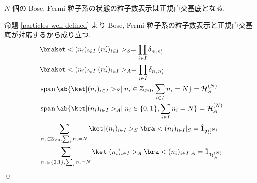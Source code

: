 \documentclass[uplatex,dvipdfmx,a4paper,11pt]{jlreq}
\makeatletter
\DeclareMathOperator{\Span}{span}
\newcommand{\ZZ}{\mathbb{Z}}
\newcommand{\HH}{\mathcal{H}}
\numberwithin{equation}{section}
\theoremstyle{definition}
\renewenvironment{proof}[1][\proofname]{\par
  \normalfont
  \topsep6\p@\@plus6\p@ \trivlist
  \item[\hskip\labelsep{\bfseries #1}\@addpunct{\bfseries}]\ignorespaces\quad\par
}{%
  \qed\endtrivlist\@endpefalse
}
\renewcommand\proofname{証明}
\makeatother
\begin{document}
\begin{theorem}
  $N$ 個の Bose, Fermi 粒子系の状態の粒子数表示は正規直交基底となる.
  \label{Fermi N character}
\end{theorem}
\begin{proof}
  命題 \ref{particles well defined} より Bose, Fermi 粒子系の粒子数表示と正規直交基底が対応するから成り立つ.
  \begin{align}
     & \braket<(n_i)_{i\in I}|(n_i')_{i\in I}>_S = \prod_{i\in I}\delta_{n_in_i'}                                    \\
     & \braket<(n_i)_{i\in I}|(n_i')_{i\in I}>_A = \prod_{i\in I}\delta_{n_in_i'}                                    \\
     & \Span\ab\{\ket|(n_i)_{i\in I}>_S \mid n_i\in\ZZ_{\geq 0}, \sum_{i\in I}n_i = N \} = \HH_S^{(N)}               \\
     & \Span\ab\{\ket|(n_i)_{i\in I}>_A \mid n_i\in\{0, 1\}, \sum_{i\in I}n_i = N \} = \HH_A^{(N)}                   \\
     & \sum_{n_i\in\ZZ_{\geq 0}, \sum_i n_i = N}\ket|(n_i)_{i\in I}>_S\bra<(n_i)_{i\in I}|_S = \hat{1}_{\HH_S^{(N)}} \\
     & \sum_{n_i\in\{0, 1\}, \sum_i n_i = N} \ket|(n_i)_{i\in I}>_A\bra<(n_i)_{i\in I}|_A = \hat{1}_{\HH_A^{(N)}}
  \end{align}
\end{proof}
\end{document}
